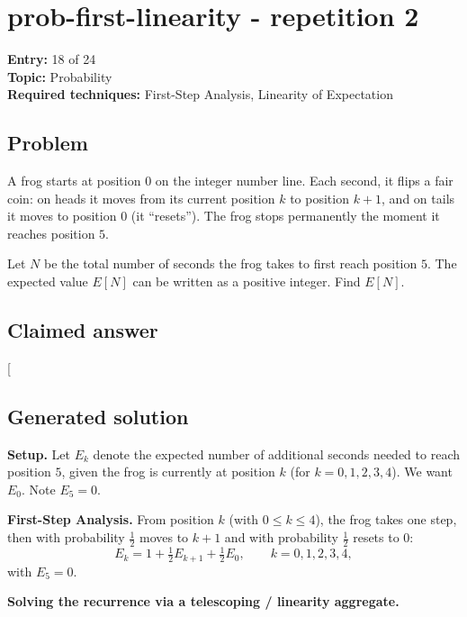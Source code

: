 \documentclass[
  11pt,
  letterpaper,
]{article}
\begin{document}
\clearpage

\section{prob-first-linearity - repetition
2}\label{prob-first-linearity---repetition-2}

\textbf{Entry:} 18 of 24\\
\textbf{Topic:} Probability\\
\textbf{Required techniques:} First-Step Analysis, Linearity of
Expectation

\subsection{Problem}\label{problem-17}

A frog starts at position 0 on the integer number line. Each second, it
flips a fair coin: on heads it moves from its current position \(k\) to
position \(k+1\), and on tails it moves to position \(0\) (it
``resets''). The frog stops permanently the moment it reaches position
\(5\).

Let \(N\) be the total number of seconds the frog takes to first reach
position \(5\). The expected value \(E[N]\) can be written as a positive
integer. Find \(E[N]\).

\subsection{Claimed answer}\label{claimed-answer-17}

{[}\boxed{62}{]}

\subsection{Generated solution}\label{generated-solution-17}

\textbf{Setup.} Let \(E_k\) denote the expected number of additional
seconds needed to reach position \(5\), given the frog is currently at
position \(k\) (for \(k = 0,1,2,3,4\)). We want \(E_0\). Note
\(E_5 = 0\).

\textbf{First-Step Analysis.} From position \(k\) (with
\(0 \le k \le 4\)), the frog takes one step, then with probability
\(\tfrac12\) moves to \(k+1\) and with probability \(\tfrac12\) resets
to \(0\): \[
E_k = 1 + \tfrac12 E_{k+1} + \tfrac12 E_0, \qquad k = 0,1,2,3,4,
\] with \(E_5 = 0\).

\textbf{Solving the recurrence via a telescoping / linearity aggregate.}
\end{document}

